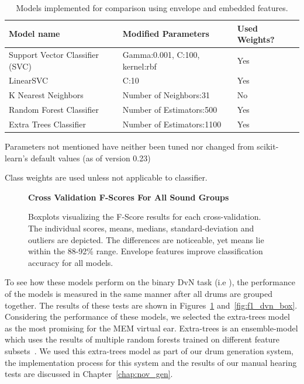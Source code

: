 \documentclass[\main/thesis.tex]{subfiles}
\begin{document}
\begin{table}[t]
    \centering \hspace*{-0.8cm}
    \begin{threeparttable}
    \begin{tabular}[width=0.95\paperwidth]{|l|l|l|}
    \hline
    Model name & Modified Parameters\tnote{\dag}  & Used Weights? \tnote{\ddag} \\\hline
     Support Vector Classifier (SVC) &  Gamma:0.001, C:100, kernel:rbf & Yes\\
     LinearSVC & C:10 & Yes\\
     K Nearest Neighbors & Number of Neighbors:31 &  No \\
     Random Forest Classifier & Number of Estimators:500 & Yes \\
     Extra Trees Classifier & Number of Estimators:1100 & Yes\\
     \hline
    \end{tabular}
    \caption{Models implemented for comparison using envelope and embedded features. }
    \begin{tablenotes}
    \item[\dag] Parameters not mentioned have neither been tuned nor changed from scikit-learn's default values (as of version 0.23)
    \item[\ddag] Class weights are used unless not applicable to classifier.
    \end{tablenotes}
    \label{table:mem_model_selection}
    \end{threeparttable}
\end{table}

\begin{figure}[tbp]
    \begin{center}
    \textbf{Cross Validation F-Scores For All Sound Groups}\par\medskip
    \caption{Boxplots visualizing the F-Score results for each cross-validation. The individual scores, means, medians, standard-deviation and outliers are depicted. The differences are noticeable, yet means lie within the 88-92\% range. Envelope features improve classification accuracy for all models. }
    \label{fig:f1_allg_box}
    \end{center}
\end{figure}

To see how these models perform on the binary DvN task (i.e \decfirst), the performance of the models is measured in the same manner after all drums are grouped together. The results of these tests are shown in Figures~\ref{fig:f1_allg_box} and~\ref{fig:f1_dvn_box}. Considering the performance of these models, we selected the extra-trees model as the most promising for the MEM virtual ear. Extra-trees is an ensemble-model which uses the results of multiple random forests trained on different feature subsets~\cite{geurts2006extremely,pedregosa2011scikit}. We used this extra-trees model as part of our drum generation system, the implementation process for this system and the results of our manual hearing tests are discussed in Chapter~\ref{chap:nov_gen}.
\end{document}
